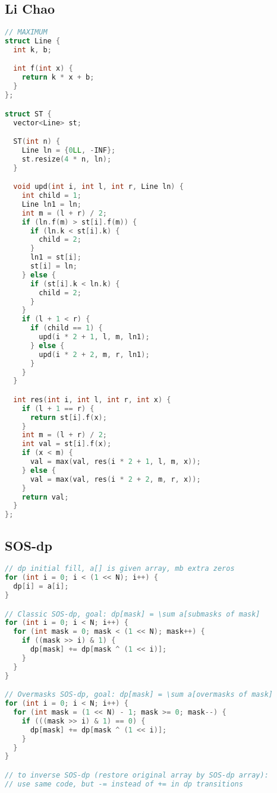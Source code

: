\documentclass[10pt,a4paper,landscape,twosided]{extarticle}
\begin{document}
\begin{multicols*}{3}
\subsection{Li Chao}
\begin{lstlisting}[language=C++]
// MAXIMUM
struct Line {
  int k, b;

  int f(int x) {
    return k * x + b;
  }
};

struct ST {
  vector<Line> st;

  ST(int n) {
    Line ln = {0LL, -INF};
    st.resize(4 * n, ln);
  }

  void upd(int i, int l, int r, Line ln) {
    int child = 1;
    Line ln1 = ln;
    int m = (l + r) / 2;
    if (ln.f(m) > st[i].f(m)) {
      if (ln.k < st[i].k) {
        child = 2;
      }
      ln1 = st[i];
      st[i] = ln;
    } else {
      if (st[i].k < ln.k) {
        child = 2;
      }
    }
    if (l + 1 < r) {
      if (child == 1) {
        upd(i * 2 + 1, l, m, ln1);
      } else {
        upd(i * 2 + 2, m, r, ln1);
      }
    }
  }

  int res(int i, int l, int r, int x) {
    if (l + 1 == r) {
      return st[i].f(x);
    }
    int m = (l + r) / 2;
    int val = st[i].f(x);
    if (x < m) {
      val = max(val, res(i * 2 + 1, l, m, x));
    } else {
      val = max(val, res(i * 2 + 2, m, r, x));
    }
    return val;
  }
};
\end{lstlisting}

\subsection{SOS-dp}
\begin{lstlisting}[language=C++]
// dp initial fill, a[] is given array, mb extra zeros
for (int i = 0; i < (1 << N); i++) {
  dp[i] = a[i];
}

// Classic SOS-dp, goal: dp[mask] = \sum a[submasks of mask]
for (int i = 0; i < N; i++) {
  for (int mask = 0; mask < (1 << N); mask++) {
    if ((mask >> i) & 1) {
      dp[mask] += dp[mask ^ (1 << i)];
    }
  }
}

// Overmasks SOS-dp, goal: dp[mask] = \sum a[overmasks of mask]
for (int i = 0; i < N; i++) {
  for (int mask = (1 << N) - 1; mask >= 0; mask--) {
    if (((mask >> i) & 1) == 0) {
      dp[mask] += dp[mask ^ (1 << i)];
    }
  }
}

// to inverse SOS-dp (restore original array by SOS-dp array):
// use same code, but -= instead of += in dp transitions
\end{lstlisting}


\end{multicols*}
\end{document}
